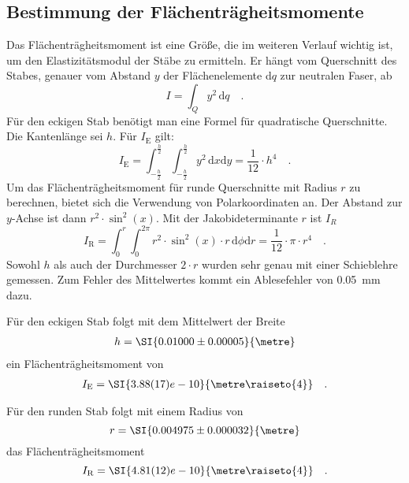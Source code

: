 \subsection{Bestimmung der Flächenträgheitsmomente}
Das Flächenträgheitsmoment ist eine Größe, die im weiteren Verlauf wichtig ist, um den Elastizitätsmodul der Stäbe zu ermitteln.
Er hängt vom Querschnitt des Stabes, genauer vom Abstand $y$ der Flächenelemente d$q$ zur neutralen Faser, ab
\begin{equation}
I = \int_{Q} y ^2 \, \text{d}q \quad .
\end{equation}
Für den eckigen Stab benötigt man eine Formel für quadratische Querschnitte. Die Kantenlänge sei $h$. Für $I_\text{E}$ gilt:
\begin{equation}
I_\text{E} = \int_{-\frac{h}{2}}^{\frac{h}{2}} \int_{-\frac{h}{2}}^{\frac{h}{2}} y^2\,  \text{d}x \text{d}y = \frac{1}{12} \cdot h^4 \quad .
\end{equation}
Um das Flächenträgheitsmoment für runde Querschnitte mit Radius $r$ zu berechnen, bietet sich die Verwendung von Polarkoordinaten an. Der Abstand zur $y$-Achse ist dann $r^2 \cdot \sin^2(x)$.  Mit der Jakobideterminante $r$ ist $I_R$
\begin{equation}
I_\text{R} = \int_{0}^{r}  \int_{0}^{2\pi} r^2 \cdot \sin^2(x) \cdot r  \, \text{d}\phi \text{d}r = \frac{1}{12}\cdot \pi \cdot r^4 \quad .
\end{equation}
Sowohl $h$ als auch der Durchmesser $2 \cdot r$ wurden sehr genau mit einer Schieblehre gemessen. Zum Fehler des Mittelwertes kommt ein Ablesefehler von \SI{0.05}{\milli\metre} dazu.



Für den eckigen Stab folgt mit dem Mittelwert der Breite
\begin{align}
  h = \SI{0.01000 \pm 0.00005}{\metre}
\end{align}
ein Flächenträgheitsmoment von
\begin{align}
I_\text{E}=\SI{3.88(17)e-10}{\metre\raiseto{4}} \quad .
\label{I_E}
\end{align}

Für den runden Stab folgt mit einem Radius von
\begin{equation}
  r = \SI{0.004975 \pm 0.000032}{\metre}
\end{equation}
das Flächenträgheitsmoment
\begin{equation}
  I_\text{R} = \SI{4.81(12)e-10}{\metre\raiseto{4}} \quad .
  \label{I_R}
\end{equation}


